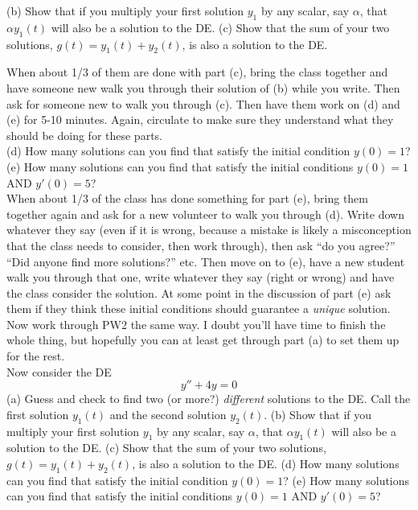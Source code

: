 \documentclass[epsf]{article}
\begin{document}
\noi (b) Show that if you multiply your first solution $y_1$ by any scalar, say $\alpha$, that $\alpha y_1(t)$ will also be a solution to the DE.
\vskip 2mm
\noi (c) Show that the sum of your two solutions, $g(t) = y_1(t)+y_2(t)$, is also a solution to the DE.
\vskip 2mm

 When about 1/3 of them are done with part (c), bring the class together and have someone new walk you through their solution of (b) while you write.  Then ask for someone new to walk you through (c).  Then have them work on (d) and (e) for 5-10 minutes.  Again, circulate to make sure they understand what they should be doing for these parts.\\

\noi (d) How many solutions can you find that satisfy the initial condition $y(0) =  1$?
\vskip 2mm
\noi (e) How many solutions can you find that satisfy the initial conditions $y(0) = 1$ AND $y'(0) = 5$?\\

 When about 1/3 of the class has done something for part (e), bring them together again and ask for a new volunteer to walk you through (d).  Write down whatever they say (even if it is wrong, because a mistake is likely a misconception that the class needs to consider, then work through), then ask ``do you agree?'' ``Did anyone find more solutions?'' etc.  Then move on to (e), have a new student walk you through that one, write whatever they say (right or wrong) and have the class consider the solution.  At some point in the discussion of part (e) ask them if they think these initial conditions should guarantee a \textit{unique} solution.\\

 Now work through PW2 the same way.  I doubt you'll have time to finish the whole thing, but hopefully you can at least get through part (a) to set them up for the rest.\\

 Now consider the DE
$$ y'' + 4y = 0$$
\noi (a) Guess and check to find two (or more?) \textit{different} solutions to the DE.  Call the first solution $y_1(t)$ and the second solution $y_2(t)$.
\vskip 2mm
\noi (b) Show that if you multiply your first solution $y_1$ by any scalar, say $\alpha$, that $\alpha y_1(t)$ will also be a solution to the DE.
\vskip 2mm
\noi (c) Show that the sum of your two solutions, $g(t) = y_1(t)+y_2(t)$, is also a solution to the DE.
\vskip 2mm
\noi (d) How many solutions can you find that satisfy the initial condition $y(0) =  1$?
\vskip 2mm
\noi (e) How many solutions can you find that satisfy the initial conditions $y(0) = 1$ AND $y'(0) = 5$?\\
\end{document}

